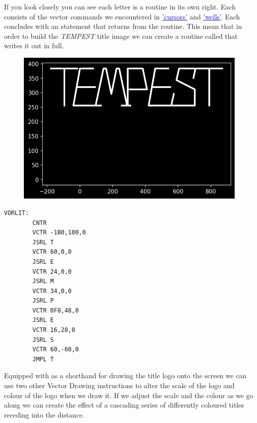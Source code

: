 \clearpage
If you look closely you can see each letter is a routine in its own right. Each consists of the vector commands
we encountered in
\hyperref[sec:cursors]{\textcolor{blue}{'cursors'}}
and
\hyperref[sec:wells]{\textcolor{blue}{'wells'}}. Each concludes with an  statement that returns
from the routine. This mean that in order to build the \textit{TEMPEST} title image
we can create a routine called  that writes it out in full.
\begin{minipage}[c]{0.58\linewidth}
\begin{figure}[H]
    \centering
    \begin{adjustbox}{width=6cm,center}
      \includegraphics[width=12cm]{src/titles/letters/TEMPEST.png}%
    \end{adjustbox}
\end{figure}
\end{minipage}
\begin{minipage}[c]{0.38\linewidth}
\begin{lstlisting}[basicstyle=\scriptsize\ttfamily]
VORLIT:
        CNTR
        VCTR -1B0,100,0
        JSRL T
        VCTR 60,0,0
        JSRL E
        VCTR 24,0,0
        JSRL M
        VCTR 34,0,0
        JSRL P
        VCTR 0F8,48,0
        JSRL E
        VCTR 16,28,0
        JSRL S
        VCTR 60,-60,0
        JMPL T
\end{lstlisting}
\vspace*{\fill}
\end{minipage}

Equipped with  as a shorthand for drawing the  title logo onto the
screen we can use two other Vector Drawing instructions to alter the scale of the logo and colour
of the logo when we draw it. If we adjust the scale and the colour as we go along we can create the
effect of a cascading series of differently coloured titles receding into the distance. 

